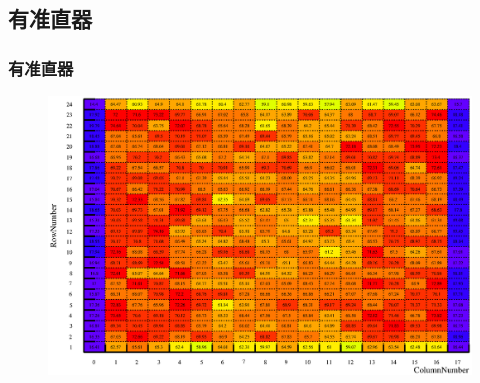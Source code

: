 \documentclass{beamer}
\begin{document}
\begin{CJK*}{UTF8}{gkai}
  \subsection{有准直器}
  \begin{frame}\frametitle{有准直器}
    \begin{minipage}[t]{0.7\textwidth}
      \vskip -0.5cm
      \begin{figure}[ht]
        \centering
        \includegraphics[width=\textwidth,height=0.58\textwidth]{WithCollimatorDirectEnergyMerged.eps}
        

\end{figure}
\end{minipage}
\end{frame}
\end{CJK*}
\end{document}
